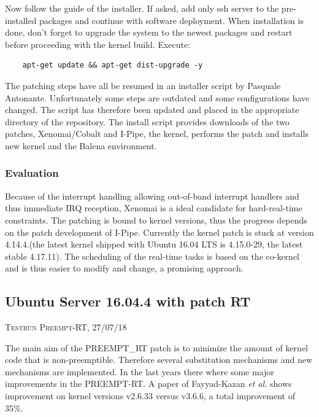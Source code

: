 \documentclass[]{scrartcl}
\begin{document}
Now follow the guide of the installer. If asked, add only ssh server to the pre-installed packages and continue with software deployment. When installation is done, don't forget to upgrade the system to the newest packages and restart before proceeding with the kernel build. Execute:

\begin{verbatim}
	apt-get update && apt-get dist-upgrade -y
\end{verbatim}

The patching steps have all be resumed in an installer script by Pasquale Antonante. Unfortunately some steps are outdated and some configurations have changed. The script has therefore been updated and placed in the appropriate directory of the repository. The install script provides downloads of the two patches, Xenomai/Cobalt and I-Pipe, the kernel, performs the patch and installs new kernel and the Balena environment.

\subsubsection{Evaluation}

Because of the interrupt handling allowing out-of-band interrupt handlers and thus immediate IRQ reception, Xenomai is a ideal candidate for hard-real-time constraints. The patching is bound to kernel versions, thus the progress depends on the patch development of I-Pipe. Currently the kernel patch is stuck at version 4.14.4.(the latest kernel shipped with Ubuntu 16.04 LTS is 4.15.0-29, the latest stable 4.17.11). The scheduling of the real-time tasks is based on the co-kernel and is thus easier to modify and change, a promising approach.

\subsection{Ubuntu Server 16.04.4 with patch RT}

{\small\textsc{Testrun Preempt-RT, 27/07/18} \bigskip}

The main aim of the PREEMPT\_RT patch is to minimize the amount of kernel code that is non-preemptible. Therefore several substitution mechanisms and new mechanisms are implemented.
In the last years there where some major improvements in the PREEMPT-RT. A paper of Fayyad-Kazan \textit{et al.} shows improvement on kernel versions v2.6.33 versus v3.6.6, a total improvement of 35\%. 
\end{document}
